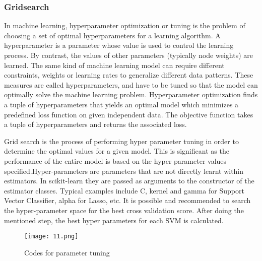 \documentclass{article}
\begin{document}
{\subsubsection{Gridsearch}
\par{In machine learning, hyperparameter optimization or tuning is the problem of choosing a set of optimal hyperparameters for a learning algorithm. A hyperparameter is a parameter whose value is used to control the learning process. By contrast, the values of other parameters (typically node weights) are learned. The same kind of machine learning model can require different constraints, weights or learning rates to generalize different data patterns. These measures are called hyperparameters, and have to be tuned so that the model can optimally solve the machine learning problem. Hyperparameter optimization finds a tuple of hyperparameters that yields an optimal model which minimizes a predefined loss function on given independent data. The objective function takes a tuple of hyperparameters and returns the associated loss.
}
\par{Grid search is the process of performing hyper parameter tuning in order to determine the optimal values for a given model. This is significant as the performance of the entire model is based on the hyper parameter values specified.Hyper-parameters are parameters that are not directly learnt within estimators. In scikit-learn they are passed as arguments to the constructor of the estimator classes. Typical examples include C, kernel and gamma for Support Vector Classifier, alpha for Lasso, etc. It is possible and recommended to search the hyper-parameter space for the best cross validation score. After doing the mentioned step, the best hyper parameters for each SVM is calculated.}

\begin{figure}[H]
   \centering
   \texttt{[image: 11.png]}
   \centering
   \caption{Codes for parameter tuning}
   \label{simulationfigure}
\end{figure}

}
\end{document}
